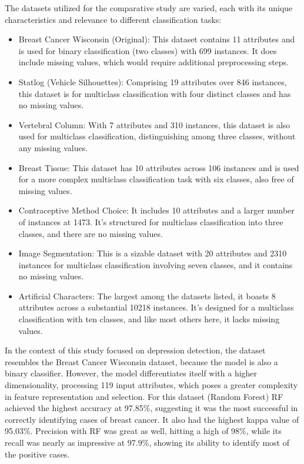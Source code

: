 The datasets utilized for the comparative study are varied, each with its unique characteristics and relevance to different classification tasks:
\begin{itemize}
 
\item Breast Cancer Wisconsin (Original): This dataset contains 11 attributes and is used for binary classification (two classes) with 699 instances. It does include missing values, which would require additional preprocessing steps.

\item Statlog (Vehicle Silhouettes): Comprising 19 attributes over 846 instances, this dataset is for multiclass classification with four distinct classes and has no missing values.

\item Vertebral Column: With 7 attributes and 310 instances, this dataset is also used for multiclass classification, distinguishing among three classes, without any missing values.

\item Breast Tissue: This dataset has 10 attributes across 106 instances and is used for a more complex multiclass classification task with six classes, also free of missing values.

\item Contraceptive Method Choice: It includes 10 attributes and a larger number of instances at 1473. It’s structured for multiclass classification into three classes, and there are no missing values.

\item Image Segmentation: This is a sizable dataset with 20 attributes and 2310 instances for multiclass classification involving seven classes, and it contains no missing values.

\item Artificial Characters: The largest among the datasets listed, it boasts 8 attributes across a substantial 10218 instances. It’s designed for a multiclass classification with ten classes, and like most others here, it lacks missing values.

\end{itemize}

In the context of this study focused on depression detection, the dataset resembles the Breast Cancer Wisconsin dataset, because the model is also a binary classifier. However, the model differentiates itself with a higher dimensionality, processing 119 input attributes, which poses a greater complexity in feature representation and selection. For this dataset (Random Forest) RF achieved the highest accuracy at 97.85\%, suggesting it was the most successful in correctly identifying cases of breast cancer. It also had the highest kappa value of 95.03\%. Precision with RF was great as well, hitting a high of 98\%, while its recall was nearly as impressive at 97.9\%, showing its ability to identify most of the positive cases. 


